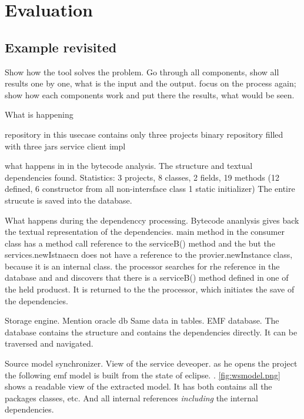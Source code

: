 \chapter{Evaluation}

\section{Example revisited}
Show how the tool solves the problem. Go through all components, show all
results one by one, what is the input and the output.
focus on the process again; show how each components work and put there the results, what would be seen.

What is happening



repository in this usecase contains only three projects binary repository filled with three jars
service
client
impl

what happens in in the bytecode analysis. The structure and textual dependencies
found.
Statistics: 3 projects, 8 classes, 2 fields, 19 methods (12 defined, 6
constructor from all non-intersface class 1 static initializer) 
The entire strucute is saved into the database.

What happens during the dependenccy processing.
Bytecode ananlysis gives back the textual representation of the dependencies.
main method  in the consumer class has a method call reference to the serviceB()
method and the but the services.newIstnaecn does not have a reference  to the
provier.newInstance class, because it is an internal class.
the processor searches for rhe reference in the database and and discovers that
there is a serviceB() method defined in one of the held producst. It is returned
to the the processor, which initiates the save of the dependencies.

Storage engine.
Mention oracle db Same data in tables.
EMF database. The database contains the structure and contains the dependencies
directly. It can be traversed and navigated.

Source model synchronizer.
View of the service deveoper. as he opens the project the following emf model is
built from the state of eclipse.
.
\autoref{fig:wsmodel.png} shows a readable view of the extracted model. It has
both contains all the packages classes, etc. And all internal references
\emph{including} the internal dependencies.

